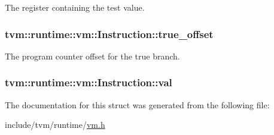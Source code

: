 The register containing the test value. 

\subsubsection[{\texorpdfstring{true\+\_\+offset}{true_offset}}]{ tvm\+::runtime\+::vm\+::\+Instruction\+::true\+\_\+offset}\hypertarget{structtvm_1_1runtime_1_1vm_1_1Instruction_a58e6e5eba0eba678b94273ef7deb1df2}{}\label{structtvm_1_1runtime_1_1vm_1_1Instruction_a58e6e5eba0eba678b94273ef7deb1df2}


The program counter offset for the true branch. 

\subsubsection[{\texorpdfstring{val}{val}}]{ tvm\+::runtime\+::vm\+::\+Instruction\+::val}\hypertarget{structtvm_1_1runtime_1_1vm_1_1Instruction_ac1e5be6bd195486a884bd8a26b5d12f9}{}\label{structtvm_1_1runtime_1_1vm_1_1Instruction_ac1e5be6bd195486a884bd8a26b5d12f9}


The documentation for this struct was generated from the following file\+:\begin{DoxyCompactItemize}
\item 
include/tvm/runtime/\hyperlink{vm_8h}{vm.\+h}\end{DoxyCompactItemize}
